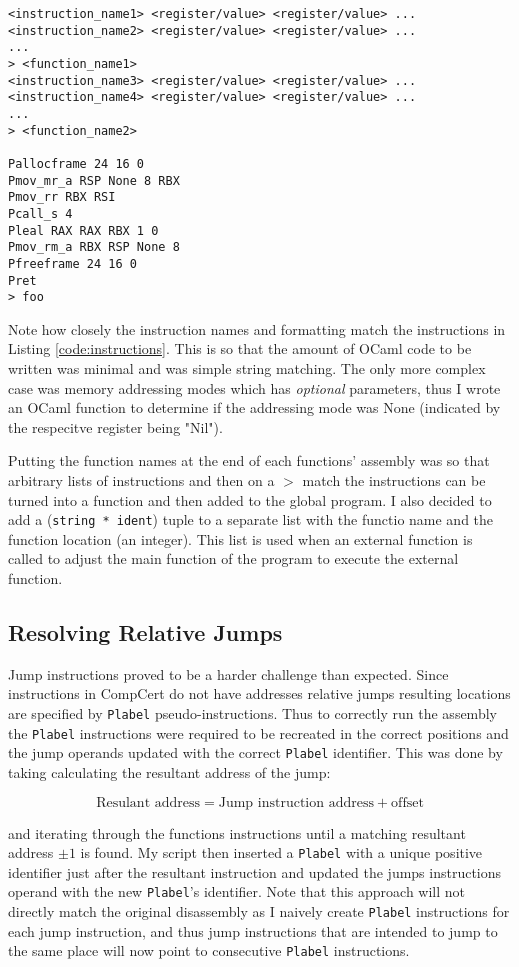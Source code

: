 \begin{lstlisting}[numbers=none,frame=lrtb,caption=Disassembly wrapper output format, label=format]
<instruction_name1> <register/value> <register/value> ...
<instruction_name2> <register/value> <register/value> ...
...
> <function_name1>
<instruction_name3> <register/value> <register/value> ...
<instruction_name4> <register/value> <register/value> ...
...
> <function_name2>

Pallocframe 24 16 0
Pmov_mr_a RSP None 8 RBX
Pmov_rr RBX RSI
Pcall_s 4
Pleal RAX RAX RBX 1 0
Pmov_rm_a RBX RSP None 8
Pfreeframe 24 16 0
Pret 
> foo
\end{lstlisting}

Note how closely the instruction names and formatting match the instructions in Listing \ref{code:instructions}. This is so that the amount of OCaml code to be written was minimal and was simple string matching. The only more complex case was memory addressing modes which has \textit{optional} parameters, thus I wrote an OCaml function to determine if the addressing mode was None (indicated by the respecitve register being "Nil").

Putting the function names at the end of each functions' assembly was so that arbitrary lists of instructions and then on a $>$ match the instructions can be turned into a function and then added to the global program. I also decided to add a (\texttt{string * ident}) tuple to a separate list with the functio name and the function location (an integer). This list is used when an external function is called to adjust the main function of the program to execute the external function.

\subsection{Resolving Relative Jumps}

Jump instructions proved to be a harder challenge than expected. Since instructions in CompCert do not have addresses relative jumps resulting locations are specified by \lstinline{Plabel} pseudo-instructions. Thus to correctly run the assembly the \lstinline{Plabel} instructions were required to be recreated in the correct positions and the jump operands updated with the correct \lstinline{Plabel} identifier. This was done by taking calculating the resultant address of the jump:

$$\text{Resulant address} = \text{Jump instruction address} + \text{offset}$$

and iterating through the functions instructions until a matching resultant address $\pm 1$ is found. My script then inserted a \lstinline{Plabel} with a unique positive identifier just after the resultant instruction and updated the jumps instructions operand with the new \lstinline{Plabel}'s identifier. Note that this approach will not directly match the original disassembly as I naively create \lstinline{Plabel} instructions for each jump instruction, and thus jump instructions that are intended to jump to the same place will now point to consecutive \lstinline{Plabel} instructions.

